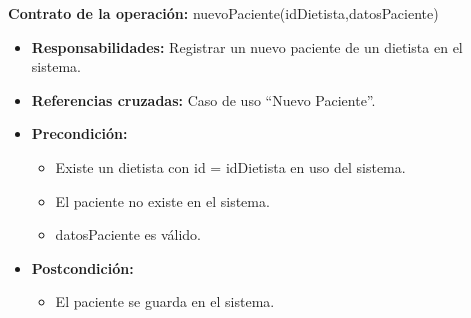 \textbf{Contrato de la operación:} nuevoPaciente(idDietista,datosPaciente)
\begin{itemize}
\item \textbf{Responsabilidades:} Registrar un nuevo paciente de un dietista en el sistema.
\item \textbf{Referencias cruzadas:} Caso de uso ``Nuevo Paciente''.
\item \textbf{Precondición:}
\begin{itemize}
\item Existe un dietista con id = idDietista en uso del sistema.
\item El paciente no existe en el sistema.
\item datosPaciente es válido.
\end{itemize}
\item \textbf{Postcondición:}
\begin{itemize}
\item El paciente se guarda en el sistema.
\end{itemize}
\end{itemize}

